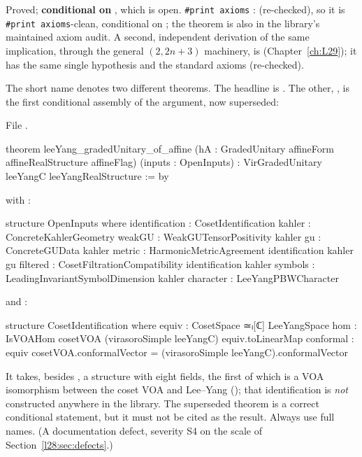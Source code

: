 \begin{status}
Proved; \textbf{conditional on }, which is open. \texttt{\#print axioms} :
 (re-checked), so it is \texttt{\#print axioms}-clean, conditional on ; the theorem
is also in the library's maintained axiom audit. A second, independent derivation of the same implication, through the
general $(2,2n+3)$ machinery, is  (Chapter~\ref{ch:L29}); it has
the same single hypothesis and the standard axioms (re-checked).
\end{status}

\begin{warning}[title={Name clash: two different theorems called \texttt{leeYang\_gradedUnitary\_of\_affine}}]\label{l28:warn:clash}
The short name  denotes two different theorems. The headline is
. The other, ,
is the first conditional assembly of the argument, now superseded:
\par\noindent File .
\begin{leancode}
theorem leeYang_gradedUnitary_of_affine
    (hA : GradedUnitary affineForm affineRealStructure affineFlag)
    (inputs : OpenInputs) : VirGradedUnitary leeYangC leeYangRealStructure := by
\end{leancode}
\noindent with :
\begin{leancode}
structure OpenInputs where
  identification : CosetIdentification
  kahler : ConcreteKahlerGeometry
  weakGU : WeakGUTensorPositivity kahler
  gu : ConcreteGUData kahler
  metric : HarmonicMetricAgreement identification kahler gu
  filtered : CosetFiltrationCompatibility identification kahler
  symbols : LeadingInvariantSymbolDimension kahler
  character : LeeYangPBWCharacter
\end{leancode}
\noindent and :
\begin{leancode}
structure CosetIdentification where
  equiv : CosetSpace ≃ₗ[ℂ] LeeYangSpace
  hom : IsVOAHom cosetVOA (virasoroSimple leeYangC) equiv.toLinearMap
  conformal : equiv cosetVOA.conformalVector =
    (virasoroSimple leeYangC).conformalVector
\end{leancode}
It takes, besides , a structure  with eight fields, the first of which is a VOA isomorphism
between the coset VOA and Lee--Yang (); that identification is \emph{not} constructed anywhere in the
library. The superseded theorem is a correct conditional statement, but it must not be cited as the result. Always use full names.
(A documentation defect, severity S4 on the scale of Section~\ref{l28:sec:defects}.)
\end{warning}

